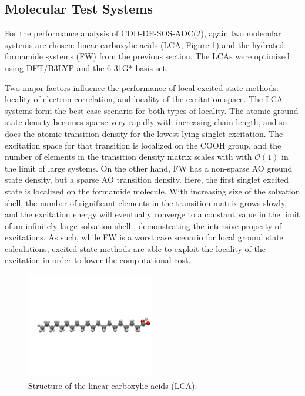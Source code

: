\subsection{Molecular Test Systems}

For the performance analysis of CDD-DF-SOS-ADC(2), again two molecular systems are chosen: linear carboxylic acids (LCA, Figure \ref{fig:ACID}) and the hydrated formamide systems (FW) from the previous section. The LCAs were optimized using DFT/B3LYP and the 6-31G* basis set.

Two major factors influence the performance of local excited state methods: locality of electron correlation, and locality of the excitation space. The LCA systems form the best case scenario for both types of locality. The atomic ground state density becomes sparse very rapidly with increasing chain length, and so does the atomic transition density for the lowest lying singlet excitation. The excitation space for that transition is localized on the COOH group, and the number of elements in the transition density matrix scales with with $\mathcal{O}(1)$ in the limit of large systems. On the other hand, FW has a non-sparse AO ground state density, but a sparse AO transition density. Here, the first singlet excited state is localized on the formamide molecule. With increasing size of the solvation shell, the number of significant elements in the transition matrix grows slowly, and the excitation energy will eventually converge to a constant value in the limit of an infinitely large solvation shell \cite{Bau2017}, demonstrating the intensive property of excitations. As such, while FW is a worst case scenario for local ground state calculations, excited state methods are able to exploit the locality of the excitation in order to lower the computational cost.   

\begin{figure}
\centering
\includegraphics[width=0.5\textwidth]{Pics/acid.png}
\caption{Structure of the linear carboxylic acids (LCA).}
\label{fig:ACID}
\end{figure}


